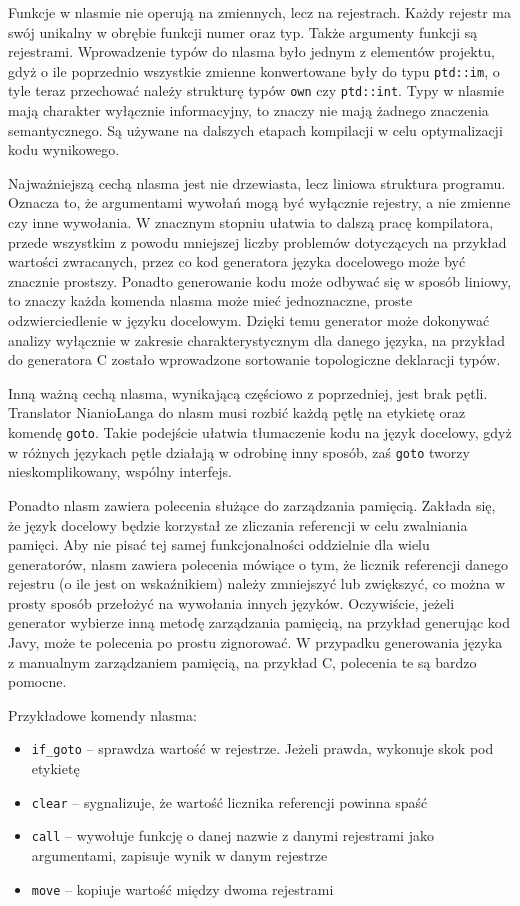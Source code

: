 \documentclass[licencjacka]{pracamgr}
\begin{document}
Funkcje w nlasmie nie operują na zmiennych, lecz na rejestrach. Każdy rejestr ma swój unikalny w obrębie funkcji numer oraz typ. Także argumenty
funkcji są rejestrami. Wprowadzenie typów do nlasma było jednym z elementów projektu, gdyż o ile poprzednio wszystkie zmienne konwertowane były do
typu \texttt{ptd::im}, o tyle teraz przechować należy strukturę typów \texttt{own} czy \texttt{ptd::int}. Typy w nlasmie mają charakter wyłącznie informacyjny,
to znaczy nie mają żadnego znaczenia semantycznego. Są używane na dalszych etapach kompilacji
w celu optymalizacji kodu wynikowego.

Najważniejszą cechą nlasma jest nie drzewiasta, lecz liniowa struktura programu. Oznacza to, że argumentami wywołań mogą być wyłącznie rejestry, a nie
zmienne czy inne wywołania. W znacznym stopniu ułatwia to dalszą pracę kompilatora, przede wszystkim z powodu mniejszej liczby problemów dotyczących na
przykład wartości zwracanych, przez co kod generatora języka docelowego może być znacznie prostszy. Ponadto generowanie kodu może odbywać się w sposób
liniowy, to znaczy każda komenda nlasma może mieć jednoznaczne, proste odzwierciedlenie w języku docelowym. Dzięki temu generator może dokonywać
analizy wyłącznie w zakresie charakterystycznym dla danego języka, na przykład do generatora C zostało wprowadzone sortowanie topologiczne deklaracji
typów.

Inną ważną cechą nlasma, wynikającą częściowo z poprzedniej, jest brak pętli. Translator NianioLanga do nlasm musi rozbić każdą pętlę na etykietę oraz
komendę \texttt{goto}. Takie podejście ułatwia tłumaczenie kodu na język docelowy, gdyż w różnych językach pętle działają w odrobinę inny sposób, zaś
\texttt{goto} tworzy nieskomplikowany, wspólny interfejs.

Ponadto nlasm zawiera polecenia służące do zarządzania pamięcią. Zakłada się, że język docelowy będzie korzystał ze zliczania referencji w celu
zwalniania pamięci. Aby nie pisać tej samej funkcjonalności oddzielnie dla wielu generatorów, nlasm zawiera polecenia mówiące o tym, że licznik
referencji danego rejestru (o ile jest on wskaźnikiem) należy zmniejszyć lub zwiększyć, co można w prosty sposób przełożyć na wywołania innych
języków. Oczywiście, jeżeli generator wybierze inną metodę zarządzania pamięcią, na przykład generując kod Javy, może te polecenia po prostu
zignorować. W przypadku generowania języka z manualnym zarządzaniem pamięcią, na przykład C, polecenia te są bardzo pomocne.


Przykładowe komendy nlasma:
\begin{itemize}
\item \texttt{if\_goto} -- sprawdza wartość w rejestrze. Jeżeli prawda, wykonuje skok pod etykietę
\item \texttt{clear} -- sygnalizuje, że wartość licznika referencji powinna spaść
\item \texttt{call} -- wywołuje funkcję o danej nazwie z danymi rejestrami jako argumentami, zapisuje wynik w danym rejestrze
\item \texttt{move} -- kopiuje wartość między dwoma rejestrami
\end{itemize}
\end{document}
